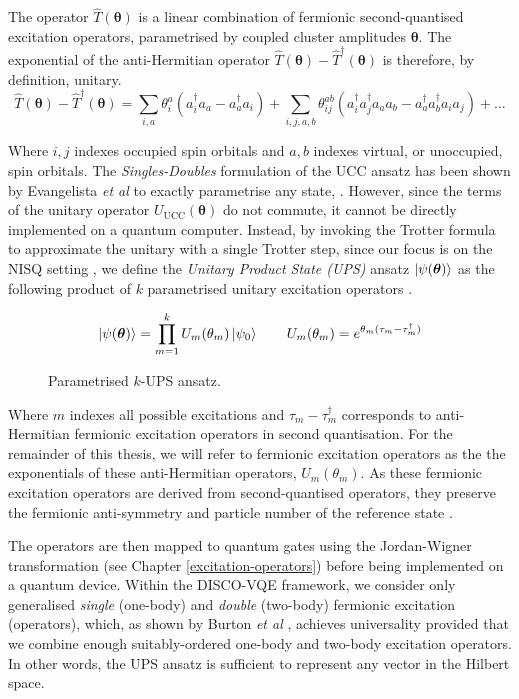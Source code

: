 The operator $\hat T(\bm\theta)$ is a linear combination of fermionic second-quantised excitation operators, parametrised by coupled cluster amplitudes $\bm\theta$. The exponential of the anti-Hermitian operator $\hat T(\bm\theta) - \hat T^\dagger(\bm\theta)$ is therefore, by definition, unitary. 
\begin{equation*}
\hat T(\bm{\theta}) - \hat T^{\dagger}(\bm{\theta}) =
\sum_{i, a} \theta^a_i (a^\dagger_i a_a - a^\dagger_a a_i) + 
\sum_{i, j, a, b} \theta^{ab}_{ij} (a^\dagger_i a^\dagger_j a_a a_b - a^\dagger_a a^\dagger_b a_i a_j) + \dots
\end{equation*}

Where $i, j$ indexes occupied spin orbitals and $a, b$ indexes virtual, or unoccupied, spin orbitals. The \textit{Singles-Doubles} formulation of the UCC ansatz has been shown by Evangelista \textit{et al} to exactly parametrise any state, \cite{Evangelista2019}. However, since the terms of the unitary operator $U_\text{UCC}(\bm\theta)$ do not commute, it cannot be directly implemented on a quantum computer. Instead, by invoking the Trotter formula to approximate the unitary with a single Trotter step, since our focus is on the NISQ setting \cite{Cowtan2020}, we define the \textit{Unitary Product State (UPS)} ansatz $\ket{\psi(\bm\theta)}$ as the following product of $k$ parametrised unitary excitation operators \cite{Burton2023}.

\begin{figure}[H]
    \centering
    \begin{equation*}
        \ket{\psi(\bm\theta)} = \prod_{m=1}^k U_m(\theta_m) \ket{\psi_0} \qquad
        U_m(\theta_m) = e^{\theta_m (\tau_m - \tau_m^\dagger)}
    \end{equation*}
    \caption{Parametrised $k$-UPS ansatz.}
\end{figure}

Where $m$ indexes all possible excitations and $\tau_m - \tau_m^\dagger$ corresponds to anti-Hermitian fermionic excitation operators in second quantisation. For the remainder of this thesis, we will refer to fermionic excitation operators as the the exponentials of these anti-Hermitian operators, $U_m(\theta_m)$. As these fermionic excitation operators are derived from second-quantised operators, they preserve the fermionic anti-symmetry and particle number of the reference state \cite{Burton2023}.

The operators are then mapped to quantum gates using the Jordan-Wigner transformation (see Chapter \ref{excitation-operators}) before being implemented on a quantum device. Within the DISCO-VQE framework, we consider only generalised \textit{single} (one-body) and \textit{double} (two-body) fermionic excitation (operators), which, as shown by Burton \textit{et al} \cite{Burton2023}, achieves universality provided that we combine enough suitably-ordered one-body and two-body excitation operators. In other words, the UPS ansatz is sufficient to represent any vector in the Hilbert space.
